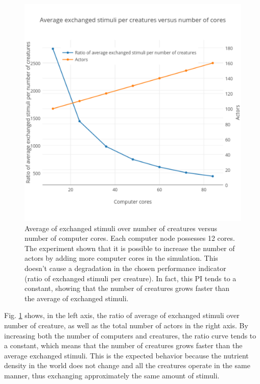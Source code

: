 \documentclass[runningheads]{llncs}
\begin{document}
\begin{figure}
	\centering
	\includegraphics[scale=0.5]{ratioCreature}
	\caption{Average of exchanged stimuli over number of creatures versus number of computer cores. Each computer node possesses 12 cores. The experiment shown that it is possible to increase the number of actors by adding more computer cores in the simulation. This doesn't cause a degradation in the chosen performance indicator (ratio of exchanged stimuli per creature). In fact, this PI tends to a constant, showing that the number of creatures grows faster than the  average of exchanged stimuli.}
	\label{fig:ratioCreature}
\end{figure}

Fig. \ref{fig:ratioCreature} shows, in the left axis, the ratio of average of exchanged stimuli over number of creature, as well as the total number of actors in the right axis. By increasing both the number of computers and creatures, the ratio curve tends to a constant, which means that the number of creatures grows faster than the average exchanged stimuli. This is the expected behavior because the nutrient density in the world does not change and all the creatures operate in the same manner, thus exchanging approximately the same amount of stimuli.
\end{document}
